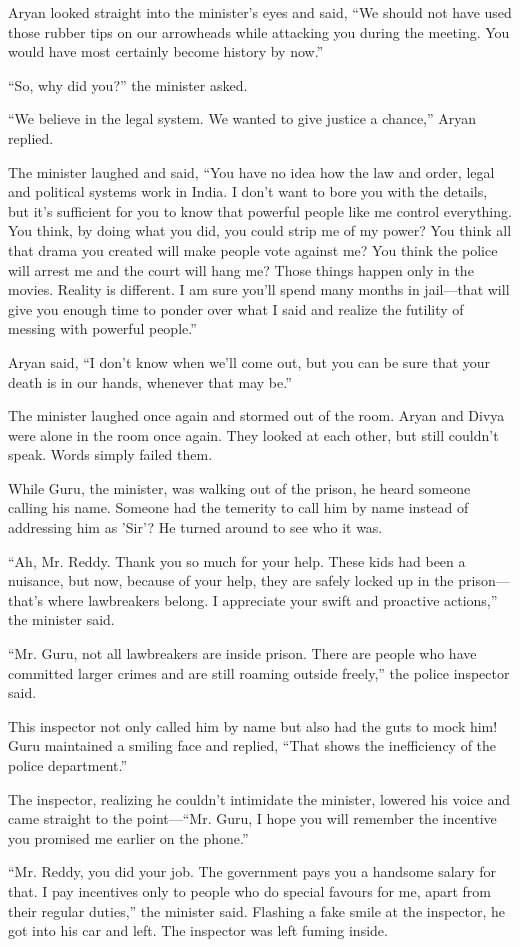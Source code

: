 Aryan looked straight into the minister's eyes and said, “We should not have
used those rubber tips on our arrowheads while attacking you during the meeting.
You would have most certainly become history by now.”

“So, why did you?” the minister asked.

“We believe in the legal system. We wanted to give justice a chance,” Aryan
replied.

The minister laughed and said, “You have no idea how the law and order, legal
and political systems work in India. I don't want to bore you with the details,
but it's sufficient for you to know that powerful people like me control
everything. You think, by doing what you did, you could strip me of my power?
You think all that drama you created will make people vote against me? You think
the police will arrest me and the court will hang me? Those things happen only
in the movies. Reality is different. I am sure you'll spend many months in
jail—that will give you enough time to ponder over what I said and realize the
futility of messing with powerful people.”

Aryan said, “I don't know when we'll come out, but you can be sure that your
death is in our hands, whenever that may be.”

The minister laughed once again and stormed out of the room. Aryan and Divya
were alone in the room once again. They looked at each other, but still couldn't
speak. Words simply failed them.

While Guru, the minister, was walking out of the prison, he heard someone
calling his name. Someone had the temerity to call him by name instead of
addressing him as 'Sir'? He turned around to see who it was.

“Ah, Mr. Reddy. Thank you so much for your help. These kids had been a nuisance, but
now, because of your help, they are safely locked up in the prison—that's where
lawbreakers belong. I appreciate your swift and proactive actions,” the minister
said.

“Mr. Guru, not all lawbreakers are inside prison. There are people who have
committed larger crimes and are still roaming outside freely,” the police
inspector said.

This inspector not only called him by name but also had the guts to mock him!
Guru maintained a smiling face and replied, “That shows the inefficiency of the
police department.”

The inspector, realizing he couldn't intimidate the minister, lowered his voice
and came straight to the point—“Mr. Guru, I hope you will remember the incentive
you promised me earlier on the phone.”

“Mr. Reddy, you did your job. The government pays you a handsome salary for that. I
pay incentives only to people who do special favours for me, apart from their
regular duties,” the minister said. Flashing a fake smile at the inspector, he
got into his car and left.  The inspector was left fuming inside.
